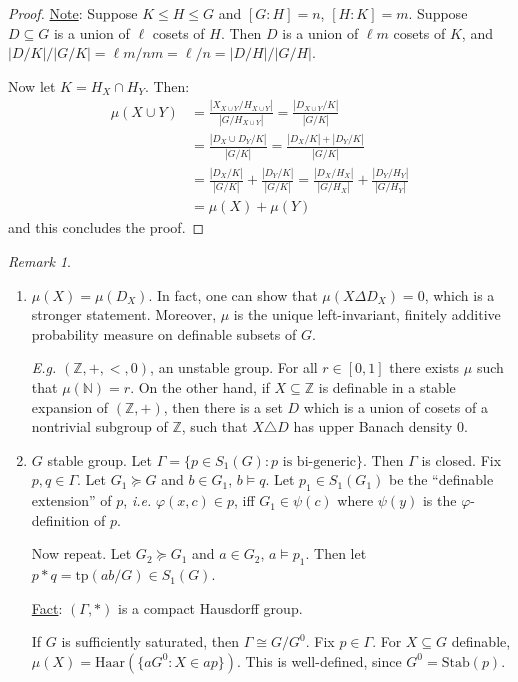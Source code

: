 \documentclass[]{article}
\theoremstyle{custhm}
\theoremstyle{cusdef}
\theoremstyle{custhm}
\theoremstyle{custhm}
\theoremstyle{custhm}
\theoremstyle{ex}
\theoremstyle{custhm}
\theoremstyle{cusdef}
\theoremstyle{remark}
\theoremstyle{remark}
\newtheorem{remark}[theorem]{Remark}
\theoremstyle{numremark}
\newcommand{\Z}{\mathbb{Z}}
\renewcommand{\it}[1]{\textit{#1}}
\renewcommand{\phi}{\varphi}
\newcommand{\tp}{\textrm{tp}}
\renewcommand{\subset}{\subseteq}
\begin{document}
\begin{proof}
	\underline{Note}: Suppose $K \le H \le G$ and $[G : H] = n$, $[H: K] = m$. Suppose $D \subset G$ is a union of $\ell$ cosets of $H$. Then $D$ is a union of $\ell m$ cosets of $K$, and $|D/K|/|G/K| = \ell m / nm = \ell / n = |D/H|/|G/H|$.

	Now let $K = H_X \cap H_Y$. Then:
	\begin{align*}
		\mu(X\cup Y) &= \frac{|X_{X\cup Y}/H_{X\cup Y}|}{|G/H_{X\cup Y}|} = \frac{|D_{X\cup Y}/K|}{|G/K|}\\
		&= \frac{|D_X\cup D_Y / K|}{|G/K|} =\frac{|D_X/K| + |D_Y/K|}{|G/K|}\\
		&= \frac{|D_X/K|}{|G/K|} + \frac{|D_Y/K|}{|G/K|} = \frac{|D_X/H_X|}{|G/H_X|} + \frac{|D_Y/H_Y|}{|G/H_Y|}\\
		&= \mu(X) + \mu(Y)
	\end{align*}
	and this concludes the proof.
\end{proof}

\begin{remark}\ 
	\begin{enumerate}
		\item $\mu(X) = \mu(D_X)$. In fact, one can show that $\mu(X\Delta D_X) = 0$, which is a stronger statement. Moreover, $\mu$ is the unique left-invariant, finitely additive probability measure on definable subsets of $G$.
		
		\it{E.g.} $(\Z,+,<,0)$, an unstable group. For all $r \in [0,1]$ there exists $\mu$ such that $\mu(\mathbb{N}) = r$. On the other hand, if $X\subset \Z$ is definable in a stable expansion of $(\Z,+)$, then there is a set $D$ which is a union of cosets of a nontrivial subgroup of $\Z$, such that $X \triangle D$ has upper Banach density $0$.

		\item $G$ stable group. Let $\Gamma = \{p \in S_1(G): p\textrm{ is bi-generic}\}$. Then $\Gamma$ is closed. Fix $p,q \in \Gamma$. Let $G_1\succeq G$ and $b \in G_1$, $b\models q$. Let $p_1 \in S_1(G_1)$ be the ``definable extension'' of $p$, \it{i.e.} $\phi(x,c) \in p$, iff $G_1 \in \psi(c)$ where $\psi(y)$ is the $\phi$-definition of $p$.
		
		Now repeat. Let $G_2 \succeq G_1$ and $a \in G_2$, $a\models p_1$. Then let $p \ast q = \tp(ab/G) \in S_1(G)$.

		\underline{Fact}: $(\Gamma,\ast)$ is a compact Hausdorff group.

		If $G$ is sufficiently saturated, then $\Gamma \cong G / G^0$. Fix $p \in \Gamma$.  For $X \subset G$ definable, $\mu(X) = \textrm{Haar}(\{aG^0: X \in ap\})$. This is well-defined, since $G^0 = \textrm{Stab}(p)$.
	\end{enumerate}
\end{remark}
\end{document}
